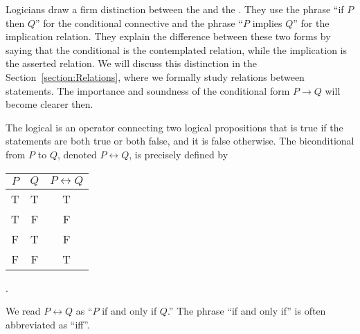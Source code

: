 Logicians draw a firm distinction between the  and the .
They use the phrase ``if $P$ then $Q$'' for the conditional connective and the phrase ``$P$ implies $Q$'' for the implication relation.
They explain the difference between these two forms by saying that the conditional is the contemplated relation, while the implication is the asserted relation.
We will discuss this distinction in the Section~\ref{section:Relations}, where we formally study relations between statements.
The importance and soundness of the conditional form $P \rightarrow Q$ will become clearer then.

The logical  is an operator connecting two logical propositions that is true if the statements are both true or both false, and it is false otherwise.
The biconditional from $P$ to $Q$, denoted $P \leftrightarrow Q$, is precisely defined by
\begin{center}
\begin{tabular}{|c|c|c|}
\hline
$P$ & $Q$ & $P \leftrightarrow Q$ \\
\hline
T & T & T \\
T & F & F \\
F & T & F \\
F & F & T \\
\hline
\end{tabular} .
\end{center}
We read $P \leftrightarrow Q$ as ``$P$ if and only if $Q$.''
The phrase ``if and only if'' is often abbreviated as ``iff''.

